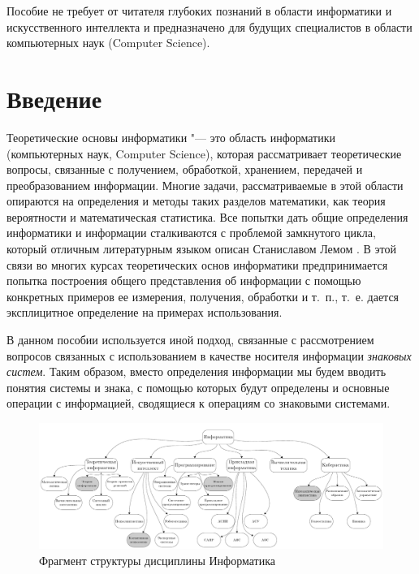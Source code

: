 \documentclass[b5paper,11pt]{book}
\begin{document}
	Пособие не требует от читателя глубоких познаний в области информатики и искусственного интеллекта и предназначено для будущих специалистов в области компьютерных наук (Computer Science).
	
	
	\tableofcontents %
		
	\chapter*{Введение}
	Теоретические основы информатики "--- это область информатики (компьютерных наук, Computer Science), которая рассматривает теоретические вопросы, связанные с получением, обработкой, хранением, передачей и преобразованием информации. Многие задачи, рассматриваемые в этой области опираются на определения и методы таких разделов математики, как теория вероятности и математическая статистика. Все попытки дать общие определения информатики и информации сталкиваются с проблемой замкнутого цикла, который отличным литературным языком описан Станиславом Лемом \cite{Lem2015}. В этой связи во многих курсах теоретических основ информатики предпринимается попытка построения общего представления об информации с помощью конкретных примеров ее измерения, получения, обработки и т.~п., т.~е. дается эксплицитное определение на примерах использования. 
	
	В данном пособии используется иной подход, связанные с рассмотрением вопросов связанных с использованием в качестве носителя информации \textit{знаковых систем}. Таким образом, вместо определения информации мы будем вводить понятия системы и знака, с помощью которых будут определены и основные операции с информацией, сводящиеся к операциям со знаковыми системами.
	
	\begin{figure}[h]
		\centering
		\includegraphics[width=\linewidth]{./tbi-textbook/inform}
		\caption{Фрагмент структуры дисциплины Информатика}
	\end{figure}
	
\end{document}
